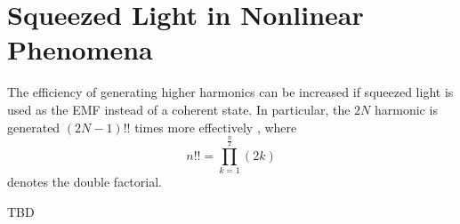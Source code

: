 \section{Squeezed Light in Nonlinear Phenomena}
The efficiency of generating higher harmonics can be increased if squeezed light is used as the EMF instead of a coherent state. In particular, the $2N$ harmonic is generated $(2N-1)!!$ times more effectively \cite[pp. 72-76]{bBykov}, where
\[
n!! = \prod_{k=1}^{\frac{n}{2}}(2k)
\]
denotes the double factorial.

TBD